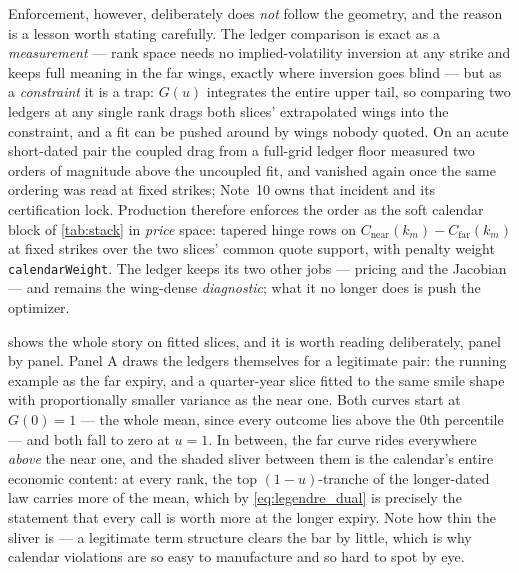 \documentclass[11pt]{article}
\begin{document}
Enforcement, however, deliberately does \emph{not} follow the geometry, and
the reason is a lesson worth stating carefully.  The ledger comparison is
exact as a \emph{measurement} --- rank space needs no implied-volatility
inversion at any strike and keeps full meaning in the far wings, exactly
where inversion goes blind --- but as a \emph{constraint} it is a trap:
$G(u)$ integrates the entire upper tail, so comparing two ledgers at any
single rank drags both slices' extrapolated wings into the constraint, and
a fit can be pushed around by wings nobody quoted.  On an acute short-dated
pair the coupled drag from a full-grid ledger floor measured two orders of
magnitude above the uncoupled fit, and vanished again once the same
ordering was read at fixed strikes; Note~10 owns that incident and its
certification lock.  Production therefore enforces the order as the soft
calendar block of \cref{tab:stack} in \emph{price} space: tapered hinge
rows on $C_{\text{near}}(k_m)-C_{\text{far}}(k_m)$ at fixed strikes over
the two slices' common quote support, with penalty weight
\texttt{calendarWeight}.  The ledger keeps its two other jobs --- pricing
and the Jacobian --- and remains the wing-dense \emph{diagnostic}; what it
no longer does is push the optimizer.

 shows the whole story on fitted slices, and it is worth
reading deliberately, panel by panel.  Panel A draws the ledgers themselves
for a legitimate pair: the running example as the far expiry, and a
quarter-year slice fitted to the same smile shape with proportionally
smaller variance as the near one.  Both curves start at $G(0)=1$ --- the
whole mean, since every outcome lies above the 0th percentile --- and both
fall to zero at $u=1$.  In between, the far curve rides everywhere
\emph{above} the near one, and the shaded sliver between them is the
calendar's entire economic content: at every rank, the top $(1-u)$-tranche
of the longer-dated law carries more of the mean, which by
\eqref{eq:legendre_dual} is precisely the statement that every call is worth
more at the longer expiry.  Note how thin the sliver is --- a legitimate
term structure clears the bar by little, which is why calendar violations
are so easy to manufacture and so hard to spot by eye.
\end{document}
